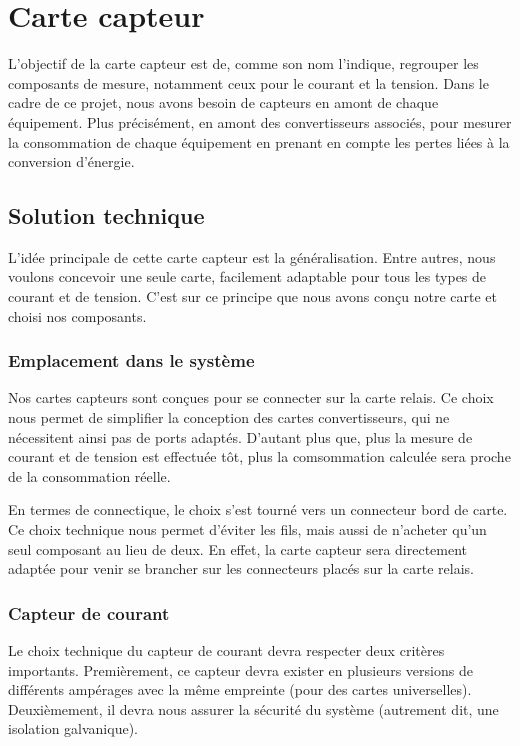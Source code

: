     \section{Carte capteur}
        L'objectif de la carte capteur est de, comme son nom l'indique, regrouper les composants de mesure, notamment ceux pour le courant et la tension. Dans le cadre de ce projet, nous avons besoin de capteurs en amont de chaque équipement. Plus précisément, en amont des convertisseurs associés, pour mesurer la consommation de chaque équipement en prenant en compte les pertes liées à la conversion d'énergie.

        \subsection{Solution technique}
            L'idée principale de cette carte capteur est la généralisation. Entre autres, nous voulons concevoir une seule carte, facilement adaptable pour tous les types de courant et de tension. C'est sur ce principe que nous avons conçu notre carte et choisi nos composants.

            \subsubsection{Emplacement dans le système}
                Nos cartes capteurs sont conçues pour se connecter sur la carte relais. Ce choix nous permet de simplifier la conception des cartes convertisseurs, qui ne nécessitent ainsi pas de ports adaptés. D'autant plus que, plus la mesure de courant et de tension est effectuée tôt, plus la comsommation calculée sera proche de la consommation réelle.
                
                En termes de connectique, le choix s'est tourné vers un connecteur bord de carte. Ce choix technique nous permet d'éviter les fils, mais aussi de n'acheter qu'un seul composant au lieu de deux. En effet, la carte capteur sera directement adaptée pour venir se brancher sur les connecteurs placés sur la carte relais.

            \subsubsection{Capteur de courant}
                Le choix technique du capteur de courant devra respecter deux critères importants. Premièrement, ce capteur devra exister en plusieurs versions de différents ampérages avec la même empreinte (pour des cartes universelles). Deuxièmement, il devra nous assurer la sécurité du système (autrement dit, une isolation galvanique).

